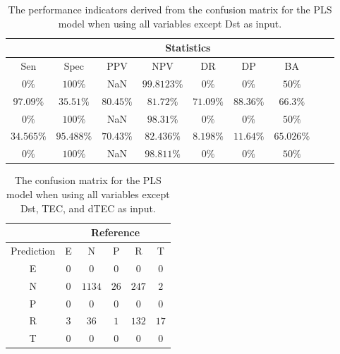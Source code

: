 \begin{table}[!ht]
	\centering
	\begin{tabular}{|c|c|c|c|c|c|c|c|c|}
		\hline
		 & \multicolumn{7}{c|}{Statistics} \\ \hline
		Sen & Spec & PPV & NPV & DR & DP & BA \\ \hline
		$0\%$ & $100\%$ & NaN & $99.8123\%$ & $0\%$ & $0\%$ & $50\%$ \\ \hline
		$97.09\%$ & $35.51\%$ & $80.45\%$ & $81.72\%$ & $71.09\%$ & $88.36\%$ & $66.3\%$ \\ \hline
		$0\%$ & $100\%$ & NaN & $98.31\%$ & $0\%$ & $0\%$ & $50\%$ \\ \hline
		$34.565\%$ & $95.488\%$ & $70.43\%$ & $82.436\%$ & $8.198\%$ & $11.64\%$ & $65.026\%$ \\ \hline
		$0\%$ & $100\%$ & NaN & $98.811\%$ & $0\%$ & $0\%$ & $50\%$ \\ \hline
	\end{tabular}
	\caption{The performance indicators derived from the confusion matrix for the PLS model when using all variables except Dst as input.}
	\label{tab:cs:noDst:pls}
\end{table}

\begin{table}[!ht]
	\centering
	\begin{tabular}{|c|c|c|c|c|c|}
		\hline
		 & \multicolumn{5}{|c|}{Reference} \\ \hline
		 Prediction & E & N & P & R & T \\ \hline
		 E & $0$ & $0$ & $0$ & $0$ & $0$ \\ \hline
		 N & $0$ & $1134$ & $26$ & $247$ & $2$ \\ \hline
		 P & $0$ & $0$ & $0$ & $0$ & $0$ \\ \hline
		 R & $3$ & $36$ & $1$ & $132$ & $17$ \\ \hline
		 T & $0$ & $0$ & $0$ & $0$ & $0$ \\ \hline
	\end{tabular}
	\caption{The confusion matrix for the PLS model when using all variables except Dst, TEC, and dTEC as input.}
	\label{tab:cm:noTEC:pls}
\end{table}

